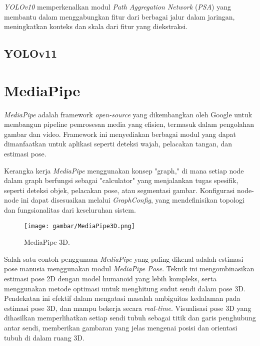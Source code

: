 \emph{YOLOv10} memperkenalkan modul \emph{Path Aggregation Network} (\emph{PSA}) yang membantu dalam menggabungkan fitur dari berbagai jalur dalam jaringan, meningkatkan konteks dan skala dari fitur yang diekstraksi.

\subsection{YOLOv11}
\label{subsec:YOLOv11}

\begin{figure}[H]
  
\end{figure}


\section{MediaPipe}
\label{sec:MediaPipe}

\emph{MediaPipe} adalah framework \emph{open-source} yang dikembangkan oleh Google untuk membangun pipeline pemrosesan media yang efisien, termasuk dalam pengolahan gambar dan video. Framework ini menyediakan berbagai modul yang dapat dimanfaatkan untuk aplikasi seperti deteksi wajah, pelacakan tangan, dan estimasi pose.

Kerangka kerja \emph{MediaPipe} menggunakan konsep "graph," di mana setiap node dalam graph berfungsi sebagai "calculator" yang menjalankan tugas spesifik, seperti deteksi objek, pelacakan pose, atau segmentasi gambar. Konfigurasi node-node ini dapat disesuaikan melalui \emph{GraphConfig}, yang mendefinisikan topologi dan fungsionalitas dari keseluruhan sistem.

\begin{figure}[H]
  \centering
  \texttt{[image: gambar/MediaPipe3D.png]}
  \caption{MediaPipe 3D.}
  \label{fig:MediaPipe3D}
\end{figure}

Salah satu contoh penggunaan \emph{MediaPipe} yang paling dikenal adalah estimasi pose manusia menggunakan modul \emph{MediaPipe Pose}. Teknik ini mengombinasikan estimasi pose 2D dengan model humanoid yang lebih kompleks, serta menggunakan metode optimasi untuk menghitung sudut sendi dalam pose 3D. Pendekatan ini efektif dalam mengatasi masalah ambiguitas kedalaman pada estimasi pose 3D, dan mampu bekerja secara \emph{real-time}. Visualisasi pose 3D yang dihasilkan memperlihatkan setiap sendi tubuh sebagai titik dan garis penghubung antar sendi, memberikan gambaran yang jelas mengenai posisi dan orientasi tubuh di dalam ruang 3D.

